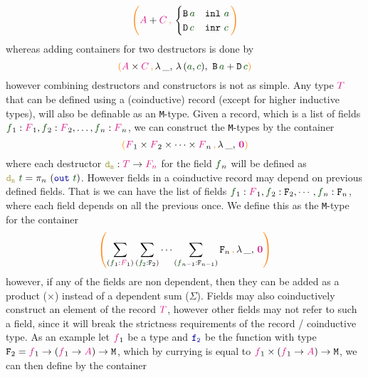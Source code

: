 \documentclass[twoside,11pt,openright]{report}
\theoremstyle{plain} %
\theoremstyle{definition}
\theoremstyle{remark}
\newcommand*{\term}[1]{\textcolor{green!30!black}{#1}} %
\newcommand*{\type}[1]{\textcolor{magenta!90!black}{#1}}
\newcommand*{\containerpair}[2]{\ensuremath{\colorlet{savedleftcolor}{.}\color{orange}\left(\color{savedleftcolor}#1\,\textcolor{orange}{\mathbf{,}}\,#2\color{orange}\right)\color{savedleftcolor}}}
\newcommand*{\containerpairsimple}[2]{\containerpair{#1}{\lambda\,\_,\,#2}}
\newcommand*{\empt}{\type{\textbf{0}}}
\newcommand*{\function}[1]{\textcolor{blue!60!black}{\ensuremath{\mathtt{#1}}}}
\newcommand*{\destructor}[1]{\textcolor{yellow!60!black}{\ensuremath{\mathtt{#1}}}}
\newcommand*{\typeformer}[1]{\ensuremath{\mathtt{#1}}}
\begin{document}
\begin{equation}
  \containerpair{\type{A} + \type{C}}{ \begin{cases} \typeformer{B}\,\term{a} & \mathtt{inl}~\term{a} \\ \typeformer{D}\,\term{c} & \mathtt{inr}~\term{c} \end{cases}}
\end{equation}
whereas adding containers for two destructors is done by
\begin{equation}
  \containerpairsimple{\type{A} \times \type{C}}{\lambda\,(\term{a},\term{c}),~\typeformer{B}\,\term{a} + \typeformer{D}\,\term{c}}  
\end{equation}
however combining destructors and constructors is not as simple. Any type \(\type{T}\) that can be defined using a (coinductive) record (except for higher inductive types), will also be definable as an \texttt{M}-type. Given a record, which is a list of fields \(\term{f}_1 : \type{F}_1,\term{f}_2 : \type{F}_2,\dots,\term{f}_n : \type{F}_n\), we can construct the \texttt{M}-types by the container
\begin{equation}
  \containerpairsimple{\type{F}_1 \times \type{F}_2 \times \dots \times \type{F}_n}{\empt}
\end{equation}
where each destructor \(\destructor{d_n} : \type{T} \rightarrow \type{F_n}\) for the field \(\term{f}_n\) will be defined as \(\destructor{d_n}~\term{t} = \pi_n~(\function{out}~\term{t})\). However fields in a coinductive record may depend on previous defined fields. That is we can have the list of fields \(\term{f}_1 : \type{F}_1,\term{f}_2 : \typeformer{F}_2,\cdots,\term{f}_n : \typeformer{F}_n\), where each field depends on all the previous once. We define this as the \texttt{M}-type for the container
\begin{equation}
  \containerpairsimple{\sum_{(\term{f}_1 : \type{F}_1)} \sum_{(\term{f_2} : \typeformer{F}_2)} \cdots \sum_{(\term{f}_{n-1} : \typeformer{F}_{n-1})}\typeformer{F}_n}{\empt}
\end{equation}
however, if any of the fields are non dependent, then they can be added as a product (\(\times\)) instead of a dependent sum (\(\Sigma\)). Fields may also coinductively construct an element of the record \(\type{T}\), however other fields may not refer to such a field, since it will break the strictness requirements of the record / coinductive type. As an example let \(\type{f}_1\) be a type and \(\function{f_2}\) be the function with type \(\typeformer{F}_2 = \type{f}_1 \rightarrow (\type{f}_1 \rightarrow \type{A}) \rightarrow \mathtt{M}\), which by currying is equal to \(\type{f}_1 \times (\type{f}_1 \rightarrow \type{A}) \rightarrow \mathtt{M}\), we can then define by the container
\end{document}
